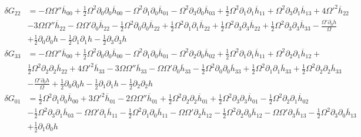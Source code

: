 \documentclass[10pt,letterpaper]{article}
\numberwithin{equation}{section}
\begin{document}
\begin{align}
	\delta G_{22} &=- \Omega \Omega '' \overline{h}_{00} + \tfrac{1}{2} \Omega^2 \partial_{0} \partial_{0} \overline{h}_{00} -  \Omega^2 \partial_{1} \partial_{0} \overline{h}_{01} -  \Omega^2 \partial_{3} \partial_{0} \overline{h}_{03} + \tfrac{1}{2} \Omega^2 \partial_{1} \partial_{1} \overline{h}_{11} + \Omega^2 \partial_{3} \partial_{1} \overline{h}_{13} + 4 \Omega '^2 \overline{h}_{22} \\
&- 3 \Omega \Omega '' \overline{h}_{22} -  \Omega \Omega ' \partial_{0} \overline{h}_{22} -  \tfrac{1}{2} \Omega^2 \partial_{0} \partial_{0} \overline{h}_{22} + \tfrac{1}{2} \Omega^2 \partial_{1} \partial_{1} \overline{h}_{22} + \tfrac{1}{2} \Omega^2 \partial_{3} \partial_{3} \overline{h}_{22} + \tfrac{1}{2} \Omega^2 \partial_{3} \partial_{3} \overline{h}_{33} -  \frac{\Omega ' \partial_{0} h}{\Omega}\nonumber \\
& + \tfrac{1}{2} \partial_{0} \partial_{0} h -  \tfrac{1}{2} \partial_{1} \partial_{1} h -  \tfrac{1}{2} \partial_{3} \partial_{3} h \nonumber
\end{align}
\begin{align}
	\delta G_{33} &=- \Omega \Omega '' \overline{h}_{00} + \tfrac{1}{2} \Omega^2 \partial_{0} \partial_{0} \overline{h}_{00} -  \Omega^2 \partial_{1} \partial_{0} \overline{h}_{01} -  \Omega^2 \partial_{2} \partial_{0} \overline{h}_{02} + \tfrac{1}{2} \Omega^2 \partial_{1} \partial_{1} \overline{h}_{11} + \Omega^2 \partial_{2} \partial_{1} \overline{h}_{12} + \\
&\tfrac{1}{2} \Omega^2 \partial_{2} \partial_{2} \overline{h}_{22} + 4 \Omega '^2 \overline{h}_{33} - 3 \Omega \Omega '' \overline{h}_{33} -  \Omega \Omega ' \partial_{0} \overline{h}_{33} -  \tfrac{1}{2} \Omega^2 \partial_{0} \partial_{0} \overline{h}_{33} + \tfrac{1}{2} \Omega^2 \partial_{1} \partial_{1} \overline{h}_{33} + \tfrac{1}{2} \Omega^2 \partial_{2} \partial_{2} \overline{h}_{33}\nonumber \\
&-  \frac{\Omega ' \partial_{0} h}{\Omega} + \tfrac{1}{2} \partial_{0} \partial_{0} h -  \tfrac{1}{2} \partial_{1} \partial_{1} h -  \tfrac{1}{2} \partial_{2} \partial_{2} h\nonumber
\end{align}
\begin{align}
	\delta G_{01} &=\tfrac{1}{2} \Omega^2 \partial_{1} \partial_{0} \overline{h}_{00} + 3 \Omega '^2 \overline{h}_{01} - 2 \Omega \Omega '' \overline{h}_{01} + \tfrac{1}{2} \Omega^2 \partial_{2} \partial_{2} \overline{h}_{01} + \tfrac{1}{2} \Omega^2 \partial_{3} \partial_{3} \overline{h}_{01} -  \tfrac{1}{2} \Omega^2 \partial_{2} \partial_{1} \overline{h}_{02}\\
& -  \tfrac{1}{2} \Omega^2 \partial_{3} \partial_{1} \overline{h}_{03} -  \Omega \Omega ' \partial_{1} \overline{h}_{11} -  \tfrac{1}{2} \Omega^2 \partial_{1} \partial_{0} \overline{h}_{11} -  \Omega \Omega ' \partial_{2} \overline{h}_{12} -  \tfrac{1}{2} \Omega^2 \partial_{2} \partial_{0} \overline{h}_{12} -  \Omega \Omega ' \partial_{3} \overline{h}_{13} -  \tfrac{1}{2} \Omega^2 \partial_{3} \partial_{0} \overline{h}_{13}\nonumber \\
&+ \tfrac{1}{2} \partial_{1} \partial_{0} h\nonumber
\end{align}
\end{document}
